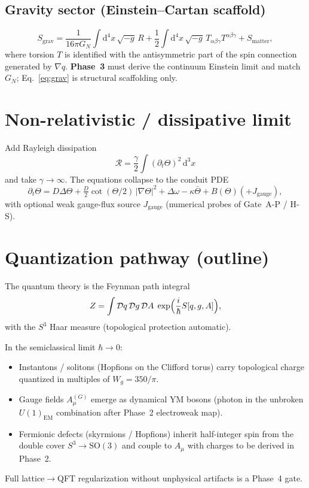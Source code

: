 \documentclass[11pt]{article}
\begin{document}
\subsection{Gravity sector (Einstein--Cartan scaffold)}
\begin{equation}
S_{\mathrm{grav}}
=\frac{1}{16\pi G_N}\int\mathrm{d}^4x\,\sqrt{-g}\,R
+\frac{1}{2}\int\mathrm{d}^4x\,\sqrt{-g}\,T_{\alpha\beta\gamma}T^{\alpha\beta\gamma}
+S_{\mathrm{matter}},
\label{eq:grav}
\end{equation}
where torsion $T$ is identified with the antisymmetric part of the spin connection
generated by $\nabla q$. \textbf{Phase~3} must derive the continuum Einstein limit and
match $G_N$; Eq.~\eqref{eq:grav} is structural scaffolding only.

\section{Non-relativistic / dissipative limit}

Add Rayleigh dissipation
\[
\mathcal{R}=\frac{\gamma}{2}\int(\partial_t\Theta)^2\,\mathrm{d}^3x
\]
and take $\gamma\to\infty$. The equations collapse to the conduit PDE
\begin{equation}
\partial_t\Theta
=D\Delta\Theta
+\tfrac{D}{2}\cot(\Theta/2)\,|\nabla\Theta|^2
+\Delta\omega
-\kappa\bar\Theta
+B(\Theta)
(+J_{\mathrm{gauge}}),
\label{eq:conduit}
\end{equation}
with optional weak gauge-flux source $J_{\mathrm{gauge}}$ (numerical probes of
Gate~A-P / H-S).

\section{Quantization pathway (outline)}

The quantum theory is the Feynman path integral
\begin{equation}
Z=\int\mathcal{D}q\,\mathcal{D}g\,\mathcal{D}A\;
\exp\Bigl(\frac{i}{\hbar}S[q,g,A]\Bigr),
\label{eq:path-int}
\end{equation}
with the $S^3$ Haar measure (topological protection automatic).

In the semiclassical limit $\hbar\to 0$:
\begin{itemize}
\item Instantons / solitons (Hopfions on the Clifford torus) carry topological charge
  quantized in multiples of $W_g=350/\pi$.
\item Gauge fields $A_\mu^{(G)}$ emerge as dynamical YM bosons (photon in the unbroken
  $U(1)_{\mathrm{EM}}$ combination after Phase~2 electroweak map).
\item Fermionic defects (skyrmions / Hopfions) inherit half-integer spin from the double
  cover $S^3\to\mathrm{SO}(3)$ and couple to $A_\mu$ with charges to be derived in Phase~2.
\end{itemize}
Full lattice$\to$QFT regularization without unphysical artifacts is a Phase~4 gate.
\end{document}
